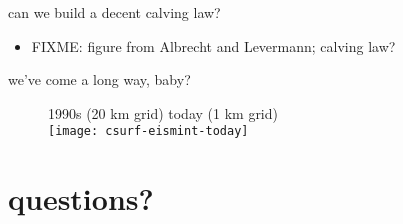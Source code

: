 \documentclass[hide notes,intlimits]{beamer}
\begin{document}
\begin{frame}{can we build a decent calving law?}

\begin{itemize}
\item FIXME:  figure from Albrecht and Levermann; calving law?
\end{itemize}
\end{frame}


\begin{frame}{we've come a long way, baby?}
  \vspace{-.25cm}
  \begin{figure}
    1990s (20 km grid) \hspace{1.75cm} today (1 km grid)\\
    \texttt{[image: csurf-eismint-today]}
  \end{figure}
\end{frame}


\section{questions?}
\end{document}

